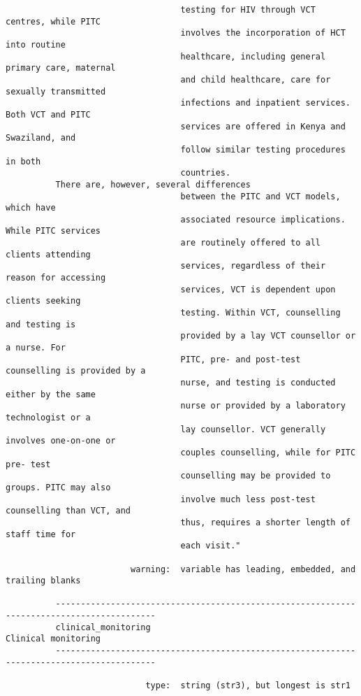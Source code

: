 \documentclass{article}
\begin{document}
\begin{verbatim}
                                   testing for HIV through VCT centres, while PITC
                                   involves the incorporation of HCT into routine
                                   healthcare, including general primary care, maternal
                                   and child healthcare, care for sexually transmitted
                                   infections and inpatient services. Both VCT and PITC
                                   services are offered in Kenya and Swaziland, and
                                   follow similar testing procedures in both
                                   countries.
          There are, however, several differences
                                   between the PITC and VCT models, which have
                                   associated resource implications. While PITC services
                                   are routinely offered to all clients attending
                                   services, regardless of their reason for accessing
                                   services, VCT is dependent upon clients seeking
                                   testing. Within VCT, counselling and testing is
                                   provided by a lay VCT counsellor or a nurse. For
                                   PITC, pre- and post-test counselling is provided by a
                                   nurse, and testing is conducted either by the same
                                   nurse or provided by a laboratory technologist or a
                                   lay counsellor. VCT generally involves one-on-one or
                                   couples counselling, while for PITC pre- test
                                   counselling may be provided to groups. PITC may also
                                   involve much less post-test counselling than VCT, and
                                   thus, requires a shorter length of staff time for
                                   each visit."
          
                         warning:  variable has leading, embedded, and trailing blanks
          
          ------------------------------------------------------------------------------------------
          clinical_monitoring                                                    Clinical monitoring
          ------------------------------------------------------------------------------------------
          
                            type:  string (str3), but longest is str1
          

\end{verbatim}
\end{document}

